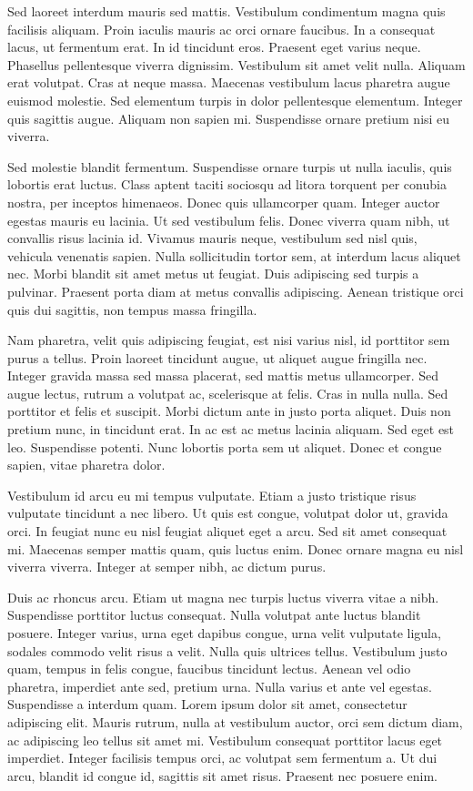 \documentclass[2pt,a4paper,twoside ]{article}
\begin{document}
\begin{multicols}{2}
Sed laoreet interdum mauris sed mattis. Vestibulum condimentum magna quis facilisis aliquam. Proin iaculis mauris ac orci ornare faucibus. In a consequat lacus, ut fermentum erat. In id tincidunt eros. Praesent eget varius neque. Phasellus pellentesque viverra dignissim. Vestibulum sit amet velit nulla. Aliquam erat volutpat. Cras at neque massa. Maecenas vestibulum lacus pharetra augue euismod molestie. Sed elementum turpis in dolor pellentesque elementum. Integer quis sagittis augue. Aliquam non sapien mi. Suspendisse ornare pretium nisi eu viverra.

Sed molestie blandit fermentum. Suspendisse ornare turpis ut nulla iaculis, quis lobortis erat luctus. Class aptent taciti sociosqu ad litora torquent per conubia nostra, per inceptos himenaeos. Donec quis ullamcorper quam. Integer auctor egestas mauris eu lacinia. Ut sed vestibulum felis. Donec viverra quam nibh, ut convallis risus lacinia id. Vivamus mauris neque, vestibulum sed nisl quis, vehicula venenatis sapien. Nulla sollicitudin tortor sem, at interdum lacus aliquet nec. Morbi blandit sit amet metus ut feugiat. Duis adipiscing sed turpis a pulvinar. Praesent porta diam at metus convallis adipiscing. Aenean tristique orci quis dui sagittis, non tempus massa fringilla.

Nam pharetra, velit quis adipiscing feugiat, est nisi varius nisl, id porttitor sem purus a tellus. Proin laoreet tincidunt augue, ut aliquet augue fringilla nec. Integer gravida massa sed massa placerat, sed mattis metus ullamcorper. Sed augue lectus, rutrum a volutpat ac, scelerisque at felis. Cras in nulla nulla. Sed porttitor et felis et suscipit. Morbi dictum ante in justo porta aliquet. Duis non pretium nunc, in tincidunt erat. In ac est ac metus lacinia aliquam. Sed eget est leo. Suspendisse potenti. Nunc lobortis porta sem ut aliquet. Donec et congue sapien, vitae pharetra dolor.

Vestibulum id arcu eu mi tempus vulputate. Etiam a justo tristique risus vulputate tincidunt a nec libero. Ut quis est congue, volutpat dolor ut, gravida orci. In feugiat nunc eu nisl feugiat aliquet eget a arcu. Sed sit amet consequat mi. Maecenas semper mattis quam, quis luctus enim. Donec ornare magna eu nisl viverra viverra. Integer at semper nibh, ac dictum purus.

Duis ac rhoncus arcu. Etiam ut magna nec turpis luctus viverra vitae a nibh. Suspendisse porttitor luctus consequat. Nulla volutpat ante luctus blandit posuere. Integer varius, urna eget dapibus congue, urna velit vulputate ligula, sodales commodo velit risus a velit. Nulla quis ultrices tellus. Vestibulum justo quam, tempus in felis congue, faucibus tincidunt lectus. Aenean vel odio pharetra, imperdiet ante sed, pretium urna. Nulla varius et ante vel egestas. Suspendisse a interdum quam. Lorem ipsum dolor sit amet, consectetur adipiscing elit. Mauris rutrum, nulla at vestibulum auctor, orci sem dictum diam, ac adipiscing leo tellus sit amet mi. Vestibulum consequat porttitor lacus eget imperdiet. Integer facilisis tempus orci, ac volutpat sem fermentum a. Ut dui arcu, blandit id congue id, sagittis sit amet risus. Praesent nec posuere enim.


\end{multicols}
\end{document}
